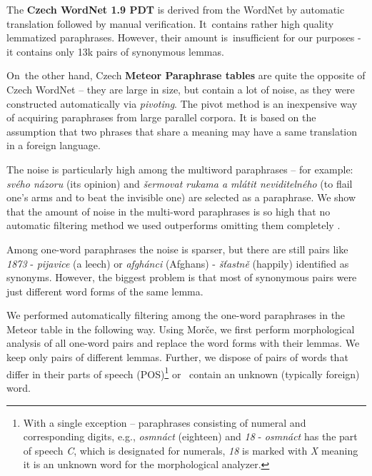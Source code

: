 \documentclass[11pt]{article}
\def\Tref#1{Table~\ref{#1}}
\begin{document}
The \textbf{Czech WordNet 1.9 PDT} is derived from the WordNet \cite{wordnet} 
by automatic translation followed by manual verification. It~contains rather 
high quality lemmatized paraphrases. However, their amount is~insufficient for 
our purposes - it contains only 13k pairs of synonymous lemmas. %

On~the other hand, Czech \textbf{Meteor Paraphrase tables} are quite the 
opposite of Czech WordNet -- they are large in size, but contain a lot of 
noise, as they were constructed automatically via \textit{pivoting}. 
\cite{pivoting} The pivot method is an inexpensive way of acquiring paraphrases 
from large parallel corpora. It is based on the assumption that two phrases 
that share a meaning may have a same translation in a foreign language. 
\cite{dyvik}

The noise is particularly high among the multiword paraphrases -- for 
example: \textit{svého názoru} (its opinion) and \textit{šermovat rukama a 
mlátit neviditelného} (to flail one's arms and to beat the invisible one) are 
selected as a paraphrase. We show that the amount of noise in the multi-word 
paraphrases is so high that no automatic filtering method we used outperforms 
omitting them completely \cite{barancikova:2014}.
 
Among one-word paraphrases the noise is sparser, but there are still pairs like 
\textit{1873} - \textit{pijavice} (a leech) or \textit{afgh\'{a}nci} (Afghans) -
\textit{š\v{t}astně} (happily) identified as synonyms. However, the biggest 
problem is that most of synonymous pairs were just different word forms of the 
same lemma. 

We performed automatically filtering among the one-word paraphrases in the 
Meteor table in the following way. Using Morče, we first perform morphological 
analysis of all one-word pairs and replace the word forms with their lemmas. We 
keep only pairs of different lemmas. Further, we dispose of pairs of words that 
differ in their parts of speech (POS)\footnote{With a single exception -- 
paraphrases consisting of numeral and corresponding digits, e.g., 
\textit{osmnáct} (eighteen) and \textit{18} - \textit{osmnáct} has the part of 
speech \textit{C}, which is designated for numerals, \textit{18} is marked with 
\textit{X} meaning it is an unknown word for the morphological analyzer.} or
~contain an unknown (typically foreign) word.
\end{document}
